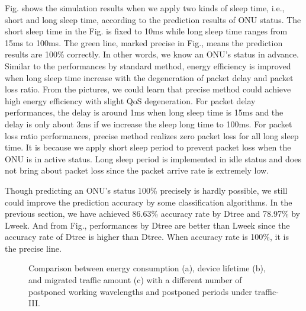 \documentclass[journal]{IEEEtran}
\begin{document}
Fig. shows the simulation results when we apply two kinds of sleep time, i.e., short and long sleep time, according to the prediction results of ONU status. The short sleep time in the Fig. is fixed to 10ms while long sleep time ranges from 15ms to 100ms. The green line, marked precise in Fig., means the prediction results are 100\% correctly. In other words, we know an ONU's status in advance. Similar to the performances by standard method, energy efficiency is improved when long sleep time increase with the degeneration of packet delay and packet loss ratio. From the pictures, we could learn that precise method could achieve high energy efficiency with slight QoS degeneration. For packet delay performances, the delay is around 1ms when long sleep time is 15ms and the delay is only about 3ms if we increase the sleep long time to 100ms. For packet loss ratio performances, precise method realizes zero packet loss for all long sleep time. It is because we apply short sleep period to prevent packet loss when the ONU is in active status. Long sleep period is implemented in idle status and does not bring about packet loss since the packet arrive rate is extremely low. 

Though predicting an ONU's status 100\% precisely is hardly possible, we still could improve the prediction accuracy by some classification algorithms. In the previous section, we have achieved 86.63\% accuracy rate by Dtree and 78.97\% by Lweek. And from Fig., performances by Dtree are better than Lweek since the accuracy rate of Dtree is higher than Dtree. When accuracy rate is 100\%, it is the precise line.

\begin{figure*}[!t]
    \centering 
    \caption{Comparison between energy consumption (a), device lifetime (b), and migrated traffic amount (c) with a different number of postponed working wavelengths and postponed periods under traffic-III.} 
    \label{segment} 
\end{figure*}
\end{document}
